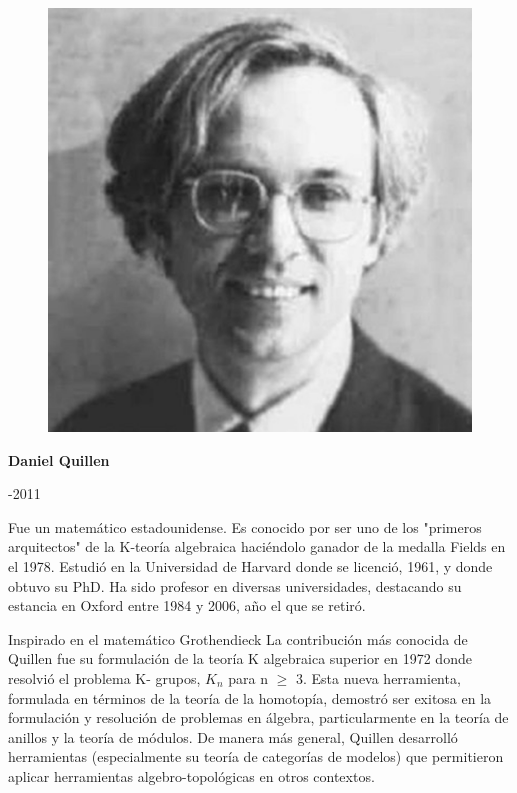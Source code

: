 \documentclass{article}
\begin{document}
\begin{figure}
    \centering
    \includegraphics[width=.6\textwidth]{DANIELQ.jpeg}
    
    \label{fig:my_label}
\end{figure}

{\centering \textbf {Daniel Quillen}\par}
\vspace{5mm}
{-2011\par}
\vspace{20mm}

Fue un matemático estadounidense. Es conocido por ser uno de los "primeros arquitectos" de la K-teoría algebraica haciéndolo ganador de la medalla Fields en el 1978. Estudió en la Universidad de Harvard donde se licenció, 1961, y donde obtuvo su PhD. Ha sido profesor en diversas universidades, destacando su estancia en Oxford entre 1984 y 2006, año el que se retiró.
\vspace{5mm}

Inspirado en el matemático Grothendieck La contribución más conocida de Quillen fue su formulación de la teoría K algebraica superior en 1972 donde resolvió el problema K- grupos, $K_n$ para n $\geq$ 3. Esta nueva herramienta, formulada en términos de la teoría de la homotopía, demostró ser exitosa en la formulación y resolución de problemas en álgebra, particularmente en la teoría de anillos y la teoría de módulos. De manera más general, Quillen desarrolló herramientas (especialmente su teoría de categorías de modelos) que permitieron aplicar herramientas algebro-topológicas en otros contextos.
\end{document}
